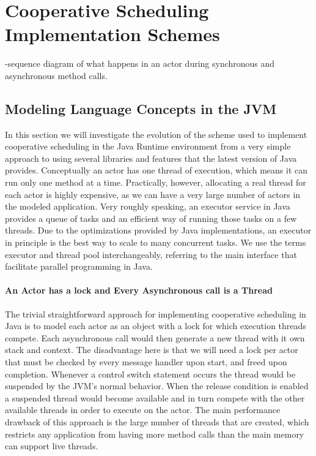\section{Cooperative Scheduling Implementation Schemes}

-sequence diagram of what happens in an actor during synchronous and asynchronous method calls.

\subsection{Modeling Language Concepts in the JVM}
In this section we will investigate the evolution of the scheme used to implement cooperative scheduling in the Java Runtime environment from a very simple approach to using several libraries and features that the latest version of Java provides. Conceptually an actor has one thread of execution, which means it can run only one method at a time. Practically, however, allocating a real thread for each actor is highly expensive, as we can have a very large number of actors in the modeled application. Very roughly speaking, an executor service in Java provides a queue of tasks and an efficient way of running those tasks on a few threads. Due to the optimizations provided by Java implementations, an executor in principle is the best way to scale to many concurrent tasks. We use the terms executor and thread pool interchangeably, referring to the main interface \cite{execserv} that facilitate parallel programming in Java. 

\paragraph{An Actor has a lock and Every Asynchronous call is a Thread}
The trivial straightforward approach for implementing cooperative scheduling in Java is to model each actor as an object with a lock for which execution threads compete. Each asynchronous call would then generate a new thread with it own stack and context. The disadvantage here is that we will need a lock per actor that must be checked by every message handler upon start, and freed upon completion. Whenever a control switch statement occurs the thread would be suspended by the JVM's normal behavior. When the release condition is enabled a suspended thread would become available and in turn compete with the other available threads in order to execute on the actor. The main performance drawback of this approach is the large number of threads that are created, which restricts any application from having more method calls than the main memory can support live threads.

